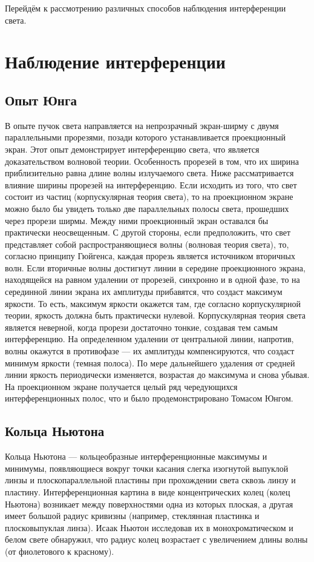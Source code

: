 \documentclass[a4paper, 12pt]{extarticle}
\begin{document}
  Перейдём к рассмотрению различных способов наблюдения интерференции света.

  \section{Наблюдение интерференции}
  \subsection{Опыт Юнга}
  В опыте пучок света направляется на непрозрачный экран-ширму с двумя параллельными прорезями,
  позади которого устанавливается проекционный экран. Этот опыт демонстрирует интерференцию света,
  что является доказательством волновой теории. Особенность прорезей в том, что их ширина
  приблизительно равна длине волны излучаемого света. Ниже рассматривается влияние ширины прорезей
  на интерференцию.  Если исходить из того, что свет состоит из частиц (корпускулярная теория
  света), то на проекционном экране можно было бы увидеть только две параллельных полосы света,
  прошедших через прорези ширмы. Между ними проекционный экран оставался бы практически
  неосвещенным.  С другой стороны, если предположить, что свет представляет собой распространяющиеся
  волны (волновая теория света), то, согласно принципу Гюйгенса, каждая прорезь является источником
  вторичных волн.  Если вторичные волны достигнут линии в середине проекционного экрана, находящейся
  на равном удалении от прорезей, синхронно и в одной фазе, то на серединной линии экрана их
  амплитуды прибавятся, что создаст максимум яркости. То есть, максимум яркости окажется там, где
  согласно корпускулярной теории, яркость должна быть практически нулевой. Корпускулярная теория
  света является неверной, когда прорези достаточно тонкие, создавая тем самым интерференцию.  На
  определенном удалении от центральной линии, напротив, волны окажутся в противофазе — их амплитуды
  компенсируются, что создаст минимум яркости (темная полоса). По мере дальнейшего удаления от
  средней линии яркость периодически изменяется, возрастая до максимума и снова убывая.  На
  проекционном экране получается целый ряд чередующихся интерференционных полос, что и было
  продемонстрировано Томасом Юнгом.

  \subsection{Кольца Ньютона}
  Кольца Ньютона — кольцеобразные интерференционные максимумы и минимумы, появляющиеся вокруг точки
  касания слегка изогнутой выпуклой линзы и плоскопараллельной пластины при прохождении света сквозь
  линзу и пластину.  Интерференционная картина в виде концентрических колец (колец Ньютона)
  возникает между поверхностями одна из которых плоская, а другая имеет большой радиус кривизны
  (например, стеклянная пластинка и плосковыпуклая линза). Исаак Ньютон исследовав их в
  монохроматическом и белом свете обнаружил, что радиус колец возрастает с увеличением длины волны
  (от фиолетового к красному).
\end{document}
